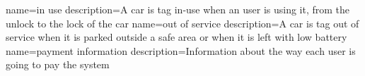{
	name={in use}
	description={A car is tag in-use when an user is using it, from the unlock to the lock of the car}
}
{
	name={out of service}
	description={A car is tag out of service when it is parked outside a safe area or when it is left with low battery}
}
{
	name={payment information}
	description={Information about the way each user is going to pay the system }
}
\begin{comment}
\newglossaryentry{battery}
{
  name={battery},
  description={},
  plural={batteries}
}
\end{comment}



